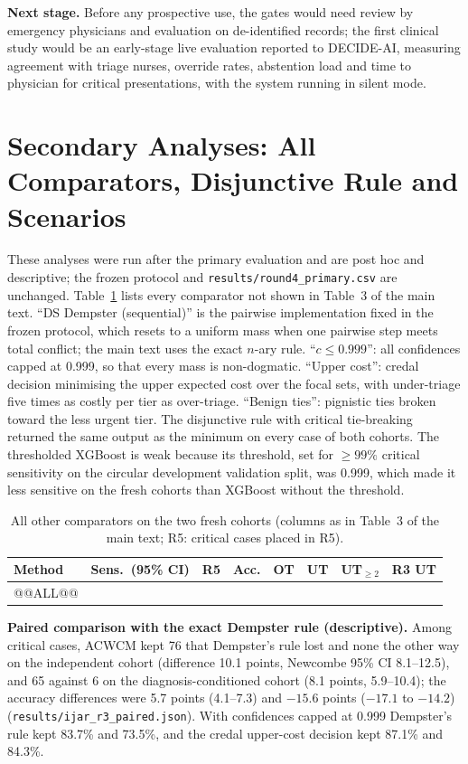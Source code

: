 \documentclass[11pt,a4paper]{article}%
\begin{document}
\textbf{Next stage.} Before any prospective use, the gates would need review by emergency physicians and evaluation on de-identified records; the first clinical study would be an early-stage live evaluation reported to DECIDE-AI, measuring agreement with triage nurses, override rates, abstention load and time to physician for critical presentations, with the system running in silent mode.

\section{Secondary Analyses: All Comparators, Disjunctive Rule and Scenarios}\label{sup:r3}

These analyses were run after the primary evaluation and are post hoc and descriptive; the frozen protocol and \texttt{results/round4\_primary.csv} are unchanged. Table~\ref{tab:all} lists every comparator not shown in Table~3 of the main text. ``DS Dempster (sequential)'' is the pairwise implementation fixed in the frozen protocol, which resets to a uniform mass when one pairwise step meets total conflict; the main text uses the exact $n$-ary rule. ``$c\le0.999$'': all confidences capped at 0.999, so that every mass is non-dogmatic. ``Upper cost'': credal decision minimising the upper expected cost over the focal sets, with under-triage five times as costly per tier as over-triage. ``Benign ties'': pignistic ties broken toward the less urgent tier. The disjunctive rule with critical tie-breaking returned the same output as the minimum on every case of both cohorts. The thresholded XGBoost is weak because its threshold, set for $\ge99\%$ critical sensitivity on the circular development validation split, was 0.999, which made it less sensitive on the fresh cohorts than XGBoost without the threshold.

\begin{table}[h]
\caption{All other comparators on the two fresh cohorts (columns as in Table~3 of the main text; R5: critical cases placed in R5).}\label{tab:all}
\footnotesize\setlength{\tabcolsep}{3pt}
\begin{tabular}{@{}lrrrrrrr@{}}
\toprule
Method & Sens.\ (95\% CI) & R5 & Acc. & OT & UT & UT$_{\ge2}$ & R3 UT \\
\midrule
@@ALL@@
\bottomrule
\end{tabular}
\end{table}

\textbf{Paired comparison with the exact Dempster rule (descriptive).} Among critical cases, ACWCM kept 76 that Dempster's rule lost and none the other way on the independent cohort (difference 10.1 points, Newcombe 95\% CI 8.1--12.5), and 65 against 6 on the diagnosis-conditioned cohort (8.1 points, 5.9--10.4); the accuracy differences were 5.7 points (4.1--7.3) and $-15.6$ points ($-17.1$ to $-14.2$) (\texttt{results/ijar\_r3\_paired.json}). With confidences capped at 0.999 Dempster's rule kept 83.7\% and 73.5\%, and the credal upper-cost decision kept 87.1\% and 84.3\%.
\end{document}

